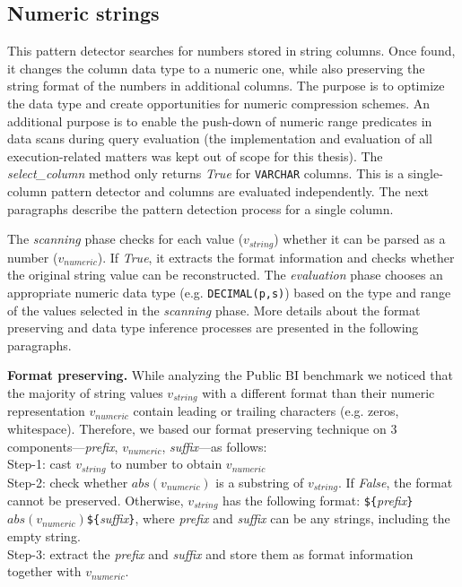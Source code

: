 \subsection{Numeric strings}
\label{subsec:pd:numericstrings}



\graphicspath{{5_automatic_learning/pattern_detection/images/}}

% 

This pattern detector searches for numbers stored in string columns. Once found, it changes the column data type to a numeric one, while also preserving the string format of the numbers in additional columns. The purpose is to optimize the data type and create opportunities for numeric compression schemes. An additional purpose is to enable the push-down of numeric range predicates in data scans during query evaluation (the implementation and evaluation of all execution-related matters was kept out of scope for this thesis). The \textit{select\_column} method only returns \textit{True} for \verb|VARCHAR| columns. This is a single-column pattern detector and columns are evaluated independently. The next paragraphs describe the pattern detection process for a single column.

The \textit{scanning} phase checks for each value (\(v_{string}\)) whether it can be parsed as a number (\(v_{numeric}\)). If \textit{True}, it extracts the format information and checks whether the original string value can be reconstructed. The \textit{evaluation} phase chooses an appropriate numeric data type (e.g. \verb|DECIMAL(p,s)|) based on the type and range of the values selected in the \textit{scanning} phase. More details about the format preserving and data type inference processes are presented in the following paragraphs.

\textbf{Format preserving.} While analyzing the Public BI benchmark we noticed that the majority of string values \(v_{string}\) with a different format than their numeric representation \(v_{numeric}\) contain leading or trailing characters (e.g. zeros, whitespace). Therefore, we based our format preserving technique on 3 components---\textit{prefix}, \(v_{numeric}\), \textit{suffix}---as follows:\\
Step-1: cast \(v_{string}\) to number to obtain \(v_{numeric}\)\\
Step-2: check whether \(abs(v_{numeric})\) is a substring of \(v_{string}\). If \textit{False}, the format cannot be preserved. Otherwise, \(v_{string}\) has the following format:
\verb|${|\textit{prefix}\verb|}|\(abs(v_{numeric})\)\verb|${|\textit{suffix}\verb|}|,
where \textit{prefix} and \textit{suffix} can be any strings, including the empty string.\\
Step-3: extract the \textit{prefix} and \textit{suffix} and store them as format information together with \(v_{numeric}\).

